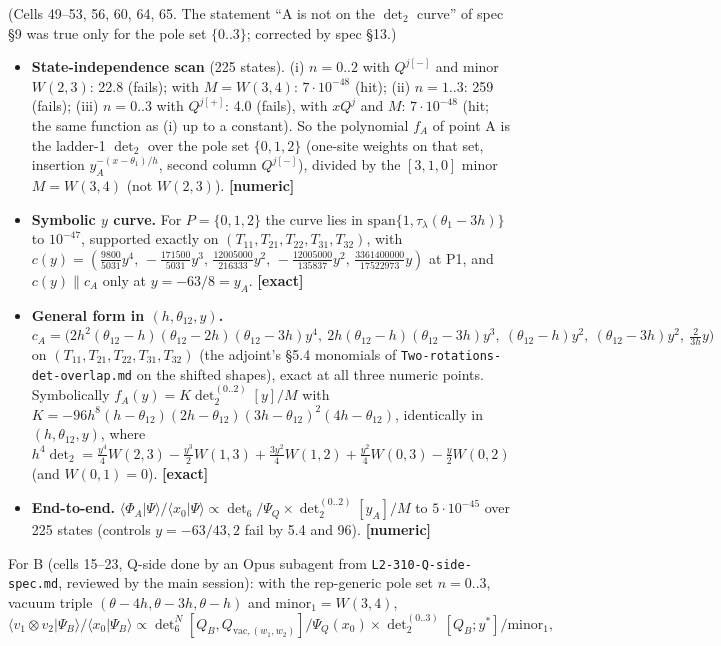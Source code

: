 \documentclass[11pt]{article}
\newcommand{\vac}{\mathrm{vac}}
\newcommand{\Tt}[1]{T_{#1}}
\newcommand{\thh}{\theta_{12}}
\newcommand{\ex}{\textbf{[exact]}}
\newcommand{\nm}{\textbf{[numeric]}}
\newcommand{\nb}[1]{\texttt{#1}}
\begin{document}
(Cells 49--53, 56, 60, 64, 65. The statement ``A is not on the $\det_2$ curve'' of spec \S9 was true only for the pole set $\{0..3\}$; corrected by spec \S13.)
\begin{itemize}
\item \textbf{State-independence scan} (225 states). (i) $n=0..2$ with $Q^{j[-]}$ and minor $W(2,3)$: 22.8 (fails); with $M=W(3,4)$: $7\cdot10^{-48}$ (hit); (ii) $n=1..3$: 259 (fails); (iii) $n=0..3$ with $Q^{j[+]}$: 4.0 (fails), with $xQ^j$ and $M$: $7\cdot10^{-48}$ (hit; the same function as (i) up to a constant). So the polynomial $f_A$ of point A is the ladder-1 $\det_2$ over the pole set $\{0,1,2\}$ (one-site weights on that set, insertion $y_A^{-(x-\theta_1)/h}$, second column $Q^{j[-]}$), divided by the $[3,1,0]$ minor $M=W(3,4)$ (not $W(2,3)$). \nm
\item \textbf{Symbolic $y$ curve.} For $P=\{0,1,2\}$ the curve lies in $\mathrm{span}\{1,\tau_\lambda(\theta_1-3h)\}$ to $10^{-47}$, supported exactly on $(\Tt{11},\Tt{21},\Tt{22},\Tt{31},\Tt{32})$, with $c(y)=(\tfrac{9800}{5031}y^4,\,-\tfrac{171500}{5031}y^3,\,\tfrac{12005000}{216333}y^2,\,-\tfrac{12005000}{135837}y^2,\,\tfrac{3361400000}{17522973}y)$ at P1, and $c(y)\parallel c_A$ only at $y=-63/8=y_A$. \ex
\item \textbf{General form in $(h,\thh,y)$.} $c_A=\big(2h^2(\thh-h)(\thh-2h)(\thh-3h)y^4,\ 2h(\thh-h)(\thh-3h)y^3,\ (\thh-h)y^2,\ (\thh-3h)y^2,\ \tfrac{2}{3h}y\big)$ on $(\Tt{11},\Tt{21},\Tt{22},\Tt{31},\Tt{32})$ (the adjoint's \S5.4 monomials of \nb{Two-rotations-det-overlap.md} on the shifted shapes), exact at all three numeric points. Symbolically $f_A(y)=K\det_2^{(0..2)}[y]/M$ with $K=-96h^8(h-\thh)(2h-\thh)(3h-\thh)^2(4h-\thh)$, identically in $(h,\thh,y)$, where $h^4\det_2=\tfrac{y^4}4W(2,3)-\tfrac{y^3}2W(1,3)+\tfrac{3y^2}4W(1,2)+\tfrac{y^2}4W(0,3)-\tfrac y2W(0,2)$ (and $W(0,1)=0$). \ex
\item \textbf{End-to-end.} $\langle\Phi_A|\Psi\rangle/\langle x_0|\Psi\rangle\propto\det_6/\Psi_Q\times\det_2^{(0..2)}[y_A]/M$ to $5\cdot10^{-45}$ over 225 states (controls $y=-63/43,2$ fail by 5.4 and 96). \nm
\end{itemize}
For B (cells 15--23, Q-side done by an Opus subagent from \nb{L2-310-Q-side-spec.md}, reviewed by the main session): with the rep-generic pole set $n=0..3$, vacuum triple $(\theta-4h,\theta-3h,\theta-h)$ and $\mathrm{minor}_1=W(3,4)$,
\[
\langle v_1\otimes v_2|\Psi_B\rangle/\langle x_0|\Psi_B\rangle\propto\det\nolimits_6^N[Q_B,Q_{\vac,(w_1,w_2)}]/\Psi_Q(x_0)\times\det\nolimits_2^{(0..3)}[Q_B;y^*]/\mathrm{minor}_1,
\]
\end{document}
